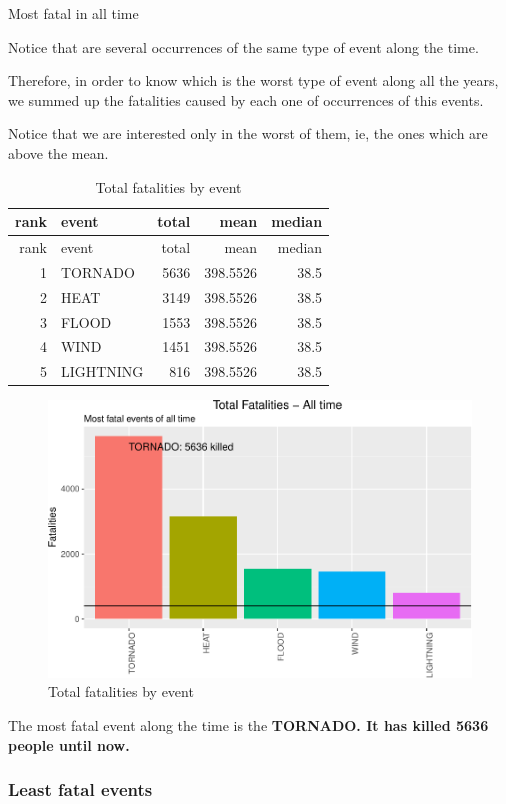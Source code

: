 \documentclass[]{article}
\begin{document}
Most fatal in all time

Notice that are several occurrences of the same type of event along the
time.

Therefore, in order to know which is the worst type of event along all
the years, we summed up the fatalities caused by each one of occurrences
of this events.

Notice that we are interested only in the worst of them, ie, the ones
which are above the mean.

\begin{longtable}[]{@{}rlrrr@{}}
\caption{Total fatalities by event}\tabularnewline
\toprule
rank & event & total & mean & median\tabularnewline
\midrule
\endfirsthead
\toprule
rank & event & total & mean & median\tabularnewline
\midrule
\endhead
1 & TORNADO & 5636 & 398.5526 & 38.5\tabularnewline
2 & HEAT & 3149 & 398.5526 & 38.5\tabularnewline
3 & FLOOD & 1553 & 398.5526 & 38.5\tabularnewline
4 & WIND & 1451 & 398.5526 & 38.5\tabularnewline
5 & LIGHTNING & 816 & 398.5526 & 38.5\tabularnewline
\bottomrule
\end{longtable}

\begin{figure}[htbp]
\centering
\includegraphics{readme_files/figure-latex/fatal-plot-alltime-1.pdf}
\caption{Total fatalities by event}
\end{figure}

The most fatal event along the time is the \textbf{TORNADO. It has
killed 5636 people until now.}

\subsubsection{Least fatal events}\label{least-fatal-events}
\end{document}
